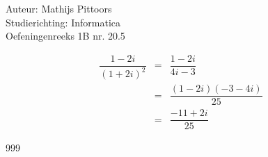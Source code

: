 \documentclass[a4paper]{article}
\begin{document}
  
\noindent \large Auteur: Mathijs Pittoors \\
\noindent \large Studierichting: Informatica\\
\noindent \large Oefeningenreeks 1B nr. 20.5\\

\medskip

\normalsize

\begin{eqnarray*}
 \dfrac{1-2i}{(1+2i)^2} & = & \dfrac{1-2i}{4i-3}\\
 &=&\dfrac{(1-2i)(-3-4i)}{25}\\
 &=&\dfrac{-11+2i}{25}
\end{eqnarray*}

\begin{thebibliography}{999}
\end{thebibliography}
\end{document}
